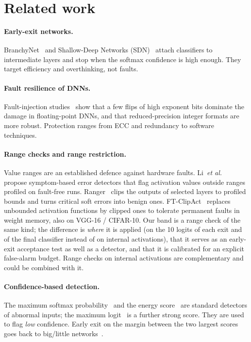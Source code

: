 \documentclass[10pt,a4paper]{article}
\begin{document}
\section{Related work}

\paragraph{Early-exit networks.} BranchyNet~\cite{branchynet} and Shallow-Deep Networks (SDN)~\cite{sdn}
attach classifiers to intermediate layers and stop when the softmax confidence is high enough. They target
efficiency and overthinking, not faults.

\paragraph{Fault resilience of DNNs.} Fault-injection studies~\cite{li2017,ares} show that a few flips of
high exponent bits dominate the damage in floating-point DNNs, and that reduced-precision integer formats
are more robust. Protection ranges from ECC and redundancy to software techniques.

\paragraph{Range checks and range restriction.} Value ranges are an established defence against hardware faults.
Li~\emph{et al.}~\cite{li2017} propose symptom-based error detectors that flag activation values outside ranges
profiled on fault-free runs. Ranger~\cite{ranger} clips the outputs of selected layers to profiled bounds and
turns critical soft errors into benign ones. FT-ClipAct~\cite{ftclipact} replaces unbounded activation functions
by clipped ones to tolerate permanent faults in weight memory, also on VGG-16 / CIFAR-10. Our band is a range check
of the same kind; the difference is \emph{where} it is applied (on the 10 logits of each exit and of the final
classifier instead of on internal activations), that it serves as an early-exit acceptance test as well as a
detector, and that it is calibrated for an explicit false-alarm budget. Range checks on internal activations are
complementary and could be combined with it.

\paragraph{Confidence-based detection.} The maximum softmax probability~\cite{msp} and the energy
score~\cite{energy} are standard detectors of abnormal inputs; the maximum logit~\cite{maxlogit} is a further
strong score. They are used to flag \emph{low} confidence. Early exit on the margin between the two largest
scores goes back to big/little networks~\cite{bigLittle}.
\end{document}
